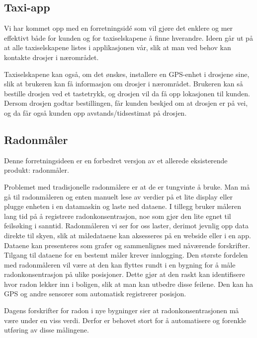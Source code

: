 \subsection{Taxi-app}

Vi har kommet opp med en forretningsidé som vil gjøre det enklere og mer effektivt både for kunden og for taxiselskapene å finne hverandre. Ideen går ut på at alle taxiselskapene listes i applikasjonen vår, slik at man ved behov kan kontakte drosjer i nærområdet.

Taxiselskapene kan også, om det ønskes, installere en GPS-enhet i drosjene sine, slik at brukeren kan få informasjon om drosjer i nærområdet. Brukeren kan så bestille drosjen ved et tastetrykk, og drosjen vil da få opp lokasjonen til kunden. Dersom drosjen godtar bestillingen, får kunden beskjed om at drosjen er på vei, og da får også kunden opp avstands/tidsestimat på drosjen.

\subsection{Radonmåler}

Denne forretningsideen er en forbedret versjon av et allerede eksisterende produkt: radonmåler.

Problemet med tradisjonelle radonmålere er at de er tungvinte å bruke.
Man må gå til radonmåleren og enten manuelt lese av verdier på et lite display eller plugge enheten i en datamaskin og laste ned dataene.
I tillegg bruker måleren lang tid på å registrere radonkonsentrasjon, noe som gjør den lite egnet til feilsøking i sanntid.
Radonmåleren vi ser for oss laster, derimot jevnlig opp data direkte til skyen, slik at måledataene kan aksesseres på en webside eller i en app.
Dataene kan presenteres som grafer og sammenlignes med nåværende forskrifter.
Tilgang til dataene for en bestemt måler krever innlogging.
Den største fordelen med radonmåleren vil være at den kan flyttes rundt i en bygning for å måle radonkonsentrasjon på ulike posisjoner. Dette gjør at den raskt kan identifisere hvor radon lekker inn i boligen, slik at man kan utbedre disse feilene.
Den kan ha GPS og andre sensorer som automatisk registrerer posisjon.

Dagens forskrifter for radon i nye bygninger sier at radonkonsentrasjonen må være under en viss verdi.
Derfor er behovet stort for å automatisere og forenkle utføring av disse målingene.

